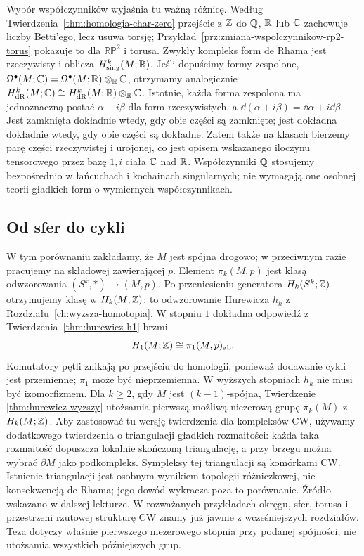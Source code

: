 Wybór współczynników wyjaśnia tu ważną różnicę.
Według Twierdzenia~\ref{thm:homologia-char-zero}
przejście z $\mathbb{Z}$ do $\mathbb{Q}$, $\mathbb{R}$ lub $\mathbb{C}$
zachowuje liczby Betti'ego, lecz usuwa torsję;
Przykład~\ref{prz:zmiana-wspolczynnikow-rp2-torus}
pokazuje to dla $\mathbb{RP}^2$ i torusa.
Zwykły kompleks form de Rhama jest rzeczywisty
i oblicza $H^k_{\mathrm{sing}}(M;\mathbb{R})$.
Jeśli dopuścimy formy zespolone,
$\Omega^\bullet(M;\mathbb{C})
=\Omega^\bullet(M;\mathbb{R})\otimes_{\mathbb{R}}\mathbb{C}$,
otrzymamy analogicznie
$H^k_{\mathrm{dR}}(M;\mathbb{C})
\cong H^k_{\mathrm{dR}}(M;\mathbb{R})\otimes_{\mathbb{R}}\mathbb{C}$.
Istotnie, każda forma zespolona ma jednoznaczną postać
$\alpha+i\beta$ dla form rzeczywistych, a
$\dd(\alpha+i\beta)=\dd\alpha+i\dd\beta$.
Jest zamknięta dokładnie wtedy, gdy obie części są zamknięte;
jest dokładna dokładnie wtedy, gdy obie części są dokładne.
Zatem także na klasach bierzemy parę części rzeczywistej i urojonej,
co jest opisem wskazanego iloczynu tensorowego przez bazę $1,i$ ciała $\mathbb{C}$ nad $\mathbb{R}$.
Współczynniki $\mathbb{Q}$ stosujemy bezpośrednio
w łańcuchach i kochainach singularnych;
nie wymagają one osobnej teorii gładkich
form o wymiernych współczynnikach.

\subsection*{Od sfer do cykli}

W tym porównaniu zakładamy, że $M$ jest spójna drogowo;
w przeciwnym razie pracujemy na składowej zawierającej $p$.
Element $\pi_k(M,p)$ jest klasą odwzorowania
$(S^k,*)\to(M,p)$. Po przeniesieniu generatora
$H_k(S^k;\mathbb{Z})$ otrzymujemy klasę w $H_k(M;\mathbb{Z})$:
to odwzorowanie Hurewicza $h_k$
z Rozdziału~\ref{ch:wyzsza-homotopia}.
W stopniu $1$ dokładna odpowiedź z
Twierdzenia~\ref{thm:hurewicz-h1} brzmi
\[
 H_1(M;\mathbb{Z})\cong\pi_1(M,p)_{\mathrm{ab}}.
\]
Komutatory pętli znikają po przejściu
do homologii, ponieważ dodawanie cykli
jest przemienne; $\pi_1$ może być nieprzemienna.
W wyższych stopniach $h_k$ nie musi być
izomorfizmem. Dla $k\geq2$, gdy $M$ jest
$(k-1)$-spójna, Twierdzenie
\ref{thm:hurewicz-wyzszy} utożsamia
pierwszą możliwą niezerową grupę
$\pi_k(M)$ z $H_k(M;\mathbb{Z})$.
Aby zastosować tu wersję twierdzenia dla kompleksów CW,
używamy dodatkowego twierdzenia o triangulacji gładkich
rozmaitości: każda taka rozmaitość dopuszcza lokalnie
skończoną triangulację, a przy brzegu można wybrać
$\partial M$ jako podkompleks. Sympleksy tej triangulacji
są komórkami CW. Istnienie triangulacji jest osobnym
wynikiem topologii różniczkowej, nie konsekwencją de Rhama;
jego dowód wykracza poza to porównanie. Źródło wskazano
w dalszej lekturze. W rozważanych przykładach okręgu,
sfer, torusa i przestrzeni rzutowej strukturę CW znamy
już jawnie z wcześniejszych rozdziałów.
Teza dotyczy właśnie pierwszego
niezerowego stopnia przy podanej spójności;
nie utożsamia wszystkich późniejszych grup.

